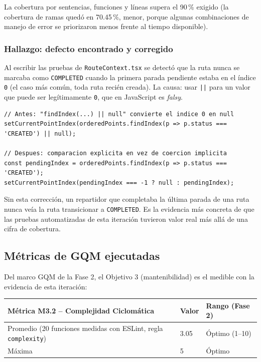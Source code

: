 \documentclass[11pt,a4paper]{article}
\begin{document}
La cobertura por sentencias, funciones y líneas supera el 90\,\% exigido (la cobertura de
ramas quedó en 70.45\,\%, menor, porque algunas combinaciones de manejo de error se
priorizaron menos frente al tiempo disponible).

\subsubsection{Hallazgo: defecto encontrado y corregido}
\label{sec:hallazgo-bug}

Al escribir las pruebas de \texttt{RouteContext.tsx} se detectó que la ruta nunca se
marcaba como \texttt{COMPLETED} cuando la primera parada pendiente estaba en el índice
\texttt{0} (el caso más común, toda ruta recién creada). La causa: usar \texttt{||} para un
valor que puede ser legítimamente \texttt{0}, que en JavaScript es \textit{falsy}.

\begin{lstlisting}[caption={\texttt{context/RouteContext.tsx}: antes y después de la corrección}]
// Antes: "findIndex(...) || null" convierte el indice 0 en null
setCurrentPointIndex(orderedPoints.findIndex(p => p.status === 'CREATED') || null);

// Despues: comparacion explicita en vez de coercion implicita
const pendingIndex = orderedPoints.findIndex(p => p.status === 'CREATED');
setCurrentPointIndex(pendingIndex === -1 ? null : pendingIndex);
\end{lstlisting}

Sin esta corrección, un repartidor que completaba la última parada de una ruta nunca veía la
ruta transicionar a \texttt{COMPLETED}. Es la evidencia más concreta de que las pruebas
automatizadas de esta iteración tuvieron valor real más allá de una cifra de cobertura.

\subsection{Métricas de GQM ejecutadas}

Del marco GQM de la Fase 2, el Objetivo 3 (mantenibilidad) es el medible con la evidencia de
esta iteración:

\begin{longtable}{p{7.5cm} p{2.2cm} p{2.5cm}}
\toprule
\textbf{Métrica M3.2 -- Complejidad Ciclomática} & \textbf{Valor} & \textbf{Rango (Fase 2)} \\
\midrule
\endhead
Promedio (20 funciones medidas con ESLint, regla \texttt{complexity}) & 3.05 & \textcolor{verde}{Óptimo (1--10)} \\
Máxima & 5 & \textcolor{verde}{Óptimo} \\
\bottomrule
\end{longtable}
\end{document}
